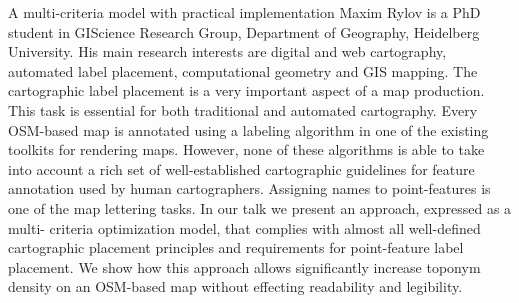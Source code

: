 %
{A multi-criteria model with practical implementation}%
{Maxim Rylov is a PhD student in GIScience Research Group, Department of Geography, Heidelberg University. His main research interests are digital and web cartography, automated label placement, computational geometry and GIS mapping.}%
{The cartographic label placement is a very important aspect of a map production. This task is essential for both traditional and automated cartography. Every OSM-based map is annotated using a labeling algorithm in one of the existing toolkits for rendering maps.  However, none of these algorithms is able to take into account a rich set of well-established cartographic guidelines for feature annotation used by human cartographers. Assigning names to point-features is one of the map lettering tasks. In our talk we present an approach, expressed as a multi-
criteria optimization model, that complies with almost all well-defined cartographic placement principles and requirements for point-feature label placement. We show how this approach allows significantly increase toponym density on an OSM-based map without effecting readability and legibility.}


